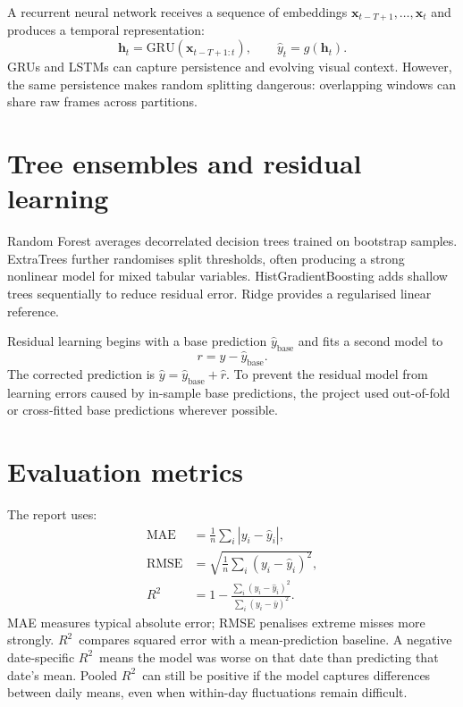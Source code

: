 \documentclass[11pt,a4paper,oneside]{report}
\newcommand{\Rtwo}{$R^2$}
\begin{document}
A recurrent neural network receives a sequence of embeddings
$\mathbf{x}_{t-T+1},\ldots,\mathbf{x}_{t}$ and produces a temporal representation:
\begin{equation}
  \mathbf{h}_t = \mathrm{GRU}(\mathbf{x}_{t-T+1:t}), \qquad
  \hat y_t = g(\mathbf{h}_t).
\end{equation}
GRUs and LSTMs can capture persistence and evolving visual context. However, the
same persistence makes random splitting dangerous: overlapping windows can share
raw frames across partitions.

\section{Tree ensembles and residual learning}
Random Forest averages decorrelated decision trees trained on bootstrap samples.
ExtraTrees further randomises split thresholds, often producing a strong nonlinear
model for mixed tabular variables. HistGradientBoosting adds shallow trees
sequentially to reduce residual error. Ridge provides a regularised linear
reference.

Residual learning begins with a base prediction $\hat y_{\mathrm{base}}$ and fits a
second model to
\begin{equation}
  r = y-\hat y_{\mathrm{base}}.
\end{equation}
The corrected prediction is $\hat y=\hat y_{\mathrm{base}}+\hat r$. To prevent
the residual model from learning errors caused by in-sample base predictions, the
project used out-of-fold or cross-fitted base predictions wherever possible.

\section{Evaluation metrics}
The report uses:
\begin{align}
  \mathrm{MAE} &= \frac{1}{n}\sum_i |y_i-\hat y_i|,\\
  \mathrm{RMSE} &= \sqrt{\frac{1}{n}\sum_i(y_i-\hat y_i)^2},\\
  R^2 &= 1-\frac{\sum_i(y_i-\hat y_i)^2}{\sum_i(y_i-\bar y)^2}.
\end{align}
MAE measures typical absolute error; RMSE penalises extreme misses more strongly.
\Rtwo\ compares squared error with a mean-prediction baseline. A negative
date-specific \Rtwo\ means the model was worse on that date than predicting that
date's mean. Pooled \Rtwo\ can still be positive if the model captures differences
between daily means, even when within-day fluctuations remain difficult.
\end{document}
